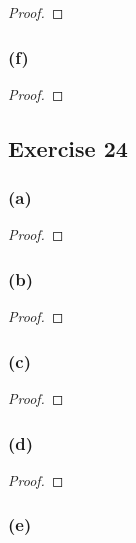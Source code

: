 \documentclass[14pt]{extarticle}
\begin{document}
\begin{proof}

\end{proof}

\subsubsection{(f)}

\begin{proof}

\end{proof}

\subsection{Exercise 24}

\subsubsection{(a)}

\begin{proof}

\end{proof}

\subsubsection{(b)}

\begin{proof}

\end{proof}

\subsubsection{(c)}

\begin{proof}

\end{proof}

\subsubsection{(d)}

\begin{proof}

\end{proof}

\subsubsection{(e)}
\end{document}

